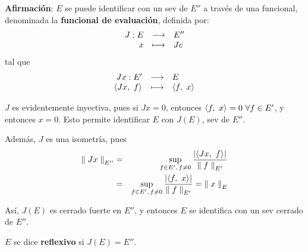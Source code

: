 \textbf{Afirmación}: $E$ se puede identificar con un sev de $E''$ a través de una funcional, denominada la \textbf{funcional de evaluación}, definida por:
\begin{equation*}
    \deffunc{J}
    {E}{E''}
    {x}{Jc}
\end{equation*}
tal que
\begin{equation*}
    \deffunc{Jx}
    {E'}{E}
    {\prodint[]{Jx}{f}}{\prodint[]{f}{x}}
\end{equation*}

$J$ es evidentemente inyectiva, pues si $Jx = 0$, entonces $\prodint[]{f}{x} = 0\ \forall f \in E'$,
y entonces $x=0$. Esto permite identificar $E$ con $J(E)$, sev de $E''$.

Además, $J$ es una isometría, pues
\begin{eqnarray*}
    \norm[E'']{Jx} 
    &=& \sup_{f \in E',\, f \not = 0} \frac{\abs{\prodint[]{Jx}{f}}}{\norm[E']{f}}\\
    &=& \sup_{f \in E',\, f \not = 0} \frac{\abs{\prodint[]{f}{x}}}{\norm[E']{f}} = \norm[E]{x}
\end{eqnarray*}

Así, $J(E)$ es cerrado fuerte en $E''$, y entonces $E$ se identifica con un sev cerrado de $E''$.

\begin{defn}
$E$  se dice \textbf{reflexivo} si $J(E) = E''$.
\end{defn}
